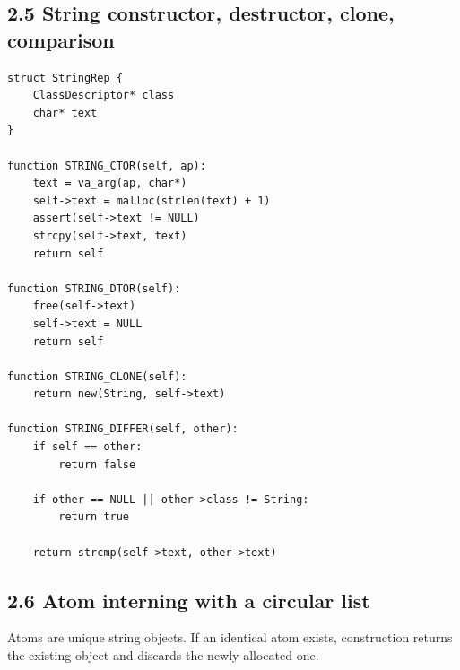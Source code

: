\documentclass[11pt]{article}
\begin{document}
\subsection{2.5 String constructor, destructor, clone,
comparison}\label{string-constructor-destructor-clone-comparison}

\begin{verbatim}
struct StringRep {
    ClassDescriptor* class
    char* text
}

function STRING_CTOR(self, ap):
    text = va_arg(ap, char*)
    self->text = malloc(strlen(text) + 1)
    assert(self->text != NULL)
    strcpy(self->text, text)
    return self

function STRING_DTOR(self):
    free(self->text)
    self->text = NULL
    return self

function STRING_CLONE(self):
    return new(String, self->text)

function STRING_DIFFER(self, other):
    if self == other:
        return false

    if other == NULL || other->class != String:
        return true

    return strcmp(self->text, other->text)
\end{verbatim}

\subsection{2.6 Atom interning with a circular
list}\label{atom-interning-with-a-circular-list}

Atoms are unique string objects. If an identical atom exists,
construction returns the existing object and discards the newly
allocated one.
\end{document}
